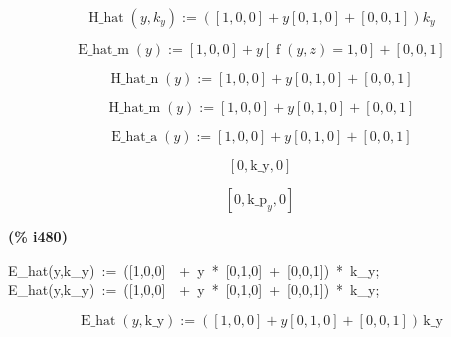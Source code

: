 \documentclass[fleqn]{article}
\begin{document}
\[\tag{\% o472} 
\operatorname{H\_ hat}\left( y\operatorname{,}{k_y}\right) \operatorname{:=}\left( \left[ 1\operatorname{,}0\operatorname{,}0\right] +y \left[ 0\operatorname{,}1\operatorname{,}0\right] +\left[ 0\operatorname{,}0\operatorname{,}1\right] \right)  {k_y}\mbox{}\]

\[\tag{\% o473} 
\operatorname{E\_ hat\_ m}(y)\operatorname{:=}\left[ 1\operatorname{,}0\operatorname{,}0\right] +y \left[ \operatorname{f}\left( y\operatorname{,}z\right) =1\operatorname{,}0\right] +\left[ 0\operatorname{,}0\operatorname{,}1\right] \mbox{}\]

\[\tag{\% o474} 
\operatorname{H\_ hat\_ n}(y)\operatorname{:=}\left[ 1\operatorname{,}0\operatorname{,}0\right] +y \left[ 0\operatorname{,}1\operatorname{,}0\right] +\left[ 0\operatorname{,}0\operatorname{,}1\right] \mbox{}\]

\[\tag{\% o475} 
\operatorname{H\_ hat\_ m}(y)\operatorname{:=}\left[ 1\operatorname{,}0\operatorname{,}0\right] +y \left[ 0\operatorname{,}1\operatorname{,}0\right] +\left[ 0\operatorname{,}0\operatorname{,}1\right] \mbox{}\]

\[\tag{\% o476} 
\operatorname{E\_ hat\_ a}(y)\operatorname{:=}\left[ 1\operatorname{,}0\operatorname{,}0\right] +y \left[ 0\operatorname{,}1\operatorname{,}0\right] +\left[ 0\operatorname{,}0\operatorname{,}1\right] \mbox{}\]

\[\tag{\% o477} 
\left[ 0\operatorname{,}\ensuremath{\mathrm{k\_ y}}\operatorname{,}0\right] \mbox{}\]

\[\tag{\% o478} 
\left[ 0\operatorname{,}{{\ensuremath{\mathrm{k\_ p}}}_y}\operatorname{,}0\right] \mbox{}
\]


\noindent
\begin{minipage}[t]{4.000000em}\color{red}\bfseries
(\% i480)	
\end{minipage}
\begin{minipage}[t]{\textwidth}\color{blue}
E\_hat(y,k\_y)\ :=\ ([1,0,0]\ \ +\ y\ *\ [0,1,0]\ +\ [0,0,1])\ *\ k\_y;\\
E\_hat(y,k\_y)\ :=\ ([1,0,0]\ \ +\ y\ *\ [0,1,0]\ +\ [0,0,1])\ *\ k\_y;
\end{minipage}
\[\displaystyle \tag{\% o479} 
\operatorname{E\_ hat}\left( y\operatorname{,}\ensuremath{\mathrm{k\_ y}}\right) \operatorname{:=}\left( \left[ 1\operatorname{,}0\operatorname{,}0\right] +y \left[ 0\operatorname{,}1\operatorname{,}0\right] +\left[ 0\operatorname{,}0\operatorname{,}1\right] \right) \, \ensuremath{\mathrm{k\_ y
}}\mbox{}\]
\end{document}
